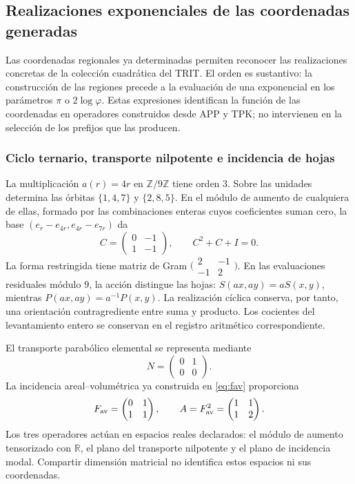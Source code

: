 \subsection{Realizaciones exponenciales de las coordenadas generadas}
\label{euler-trit-articulacion}

Las coordenadas regionales ya determinadas permiten reconocer las
realizaciones concretas de la colección cuadrática del TRIT. El orden es
sustantivo: la construcción de las regiones precede a la evaluación de una
exponencial en los parámetros \(\pi\) o \(2\log\varphi\). Estas expresiones
identifican la función de las coordenadas en operadores construidos desde
APP y TPK; no intervienen en la selección de los prefijos que las producen.

\subsubsection{Ciclo ternario, transporte nilpotente e incidencia de hojas}

La multiplicación \(a(r)=4r\) en \(\mathbb Z/9\mathbb Z\) tiene orden
\(3\). Sobre las unidades determina las órbitas \(\{1,4,7\}\) y
\(\{2,8,5\}\). En el módulo de aumento de cualquiera de ellas, formado por
las combinaciones enteras cuyos coeficientes suman cero, la base
\((e_r-e_{4r},e_{4r}-e_{7r})\) da
\[
 C=\begin{pmatrix}0&-1\\1&-1\end{pmatrix},
 \qquad C^2+C+I=0.
\]
La forma restringida tiene matriz de Gram
\(\bigl(\begin{smallmatrix}2&-1\\-1&2\end{smallmatrix}\bigr)\).
En las evaluaciones residuales módulo \(9\), la acción distingue las hojas:
\(S(ax,ay)=aS(x,y)\), mientras \(P(ax,ay)=a^{-1}P(x,y)\).
La realización cíclica conserva, por tanto, una orientación contragrediente
entre suma y producto. Los cocientes del levantamiento entero se conservan
en el registro aritmético correspondiente.

El transporte parabólico elemental se representa mediante
\[
 N=\begin{pmatrix}0&1\\0&0\end{pmatrix}.
\]
La incidencia areal--volumétrica ya construida en \eqref{eq:fav} proporciona
\[
 F_{\rm av}=\begin{pmatrix}0&1\\1&1\end{pmatrix},
 \qquad A=F_{\rm av}^2=\begin{pmatrix}1&1\\1&2\end{pmatrix}.
\]
Los tres operadores actúan en espacios reales declarados: el módulo de
aumento tensorizado con \(\mathbb R\), el plano del transporte nilpotente y
el plano de incidencia modal. Compartir dimensión matricial no identifica
estos espacios ni sus coordenadas.

